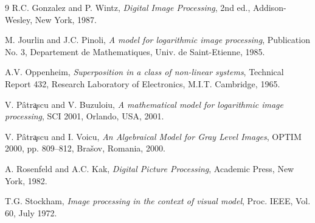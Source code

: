 \documentclass[11pt]{article}
\begin{document}
\begin{thebibliography}{9}
R.C. Gonzalez and P. Wintz, \emph{Digital Image Processing}, 2nd ed., Addison-Wesley, New York, 1987.

M. Jourlin and J.C. Pinoli, \emph{A model for logarithmic image processing}, Publication No. 3, Departement de Mathematiques, Univ. de Saint-Etienne, 1985.

A.V. Oppenheim, \emph{Superposition in a class of non-linear systems}, Technical Report 432, Research Laboratory of Electronics, M.I.T. Cambridge, 1965.

V. P\^atr\c{a}scu and V. Buzuloiu, \emph{A mathematical model for logarithmic image processing}, SCI 2001, Orlando, USA, 2001.

V. P\^atr\c{a}scu and I. Voicu, \emph{An Algebraical Model for Gray Level Images}, OPTIM 2000, pp. 809--812, Bra\v{s}ov, Romania, 2000.

A. Rosenfeld and A.C. Kak, \emph{Digital Picture Processing}, Academic Press, New York, 1982.

T.G. Stockham, \emph{Image processing in the context of visual model}, Proc. IEEE, Vol. 60, July 1972.
\end{thebibliography}
\end{document}
